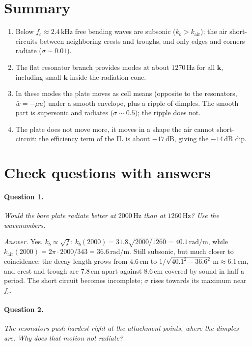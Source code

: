 \section{Summary}
\begin{enumerate}
  \item Below $f_c \approx 2.4\,\mathrm{kHz}$ free bending waves are subsonic
        ($k_b > k_\mathrm{air}$); the air short-circuits between neighboring crests
        and troughs, and only edges and corners radiate ($\sigma \sim 0.01$).
  \item The flat resonator branch provides modes at about $1270\,\mathrm{Hz}$ for all
        $\mathbf{k}$, including small $\mathbf{k}$ inside the radiation cone.
  \item In these modes the plate moves as cell means (opposite to the resonators,
        $\bar w = -\mu u$) under a smooth envelope, plus a ripple of dimples. The
        smooth part is supersonic and radiates ($\sigma \sim 0.5$); the ripple does not.
  \item The plate does not move more, it moves in a shape the air cannot short-circuit:
        the efficiency term of the IL is about $-17\,\mathrm{dB}$, giving the
        $-14\,\mathrm{dB}$ dip.
\end{enumerate}

\section{Check questions with answers}

\paragraph{Question 1.} \emph{Would the bare plate radiate better at
$2000\,\mathrm{Hz}$ than at $1260\,\mathrm{Hz}$? Use the wavenumbers.}

\emph{Answer.} Yes. $k_b \propto \sqrt{f}$: $k_b(2000) = 31.8\sqrt{2000/1260} =
40.1\,\mathrm{rad/m}$, while $k_\mathrm{air}(2000) = 2\pi\cdot 2000/343 =
36.6\,\mathrm{rad/m}$. Still subsonic, but much closer to coincidence: the decay
length grows from $4.6\,\mathrm{cm}$ to $1/\sqrt{40.1^2 - 36.6^2}\,\mathrm{m} \approx
6.1\,\mathrm{cm}$, and crest and trough are $7.8\,\mathrm{cm}$ apart against
$8.6\,\mathrm{cm}$ covered by sound in half a period. The short circuit becomes
incomplete; $\sigma$ rises towards its maximum near $f_c$.

\paragraph{Question 2.} \emph{The resonators push hardest right at the attachment
points, where the dimples are. Why does that motion not radiate?}

